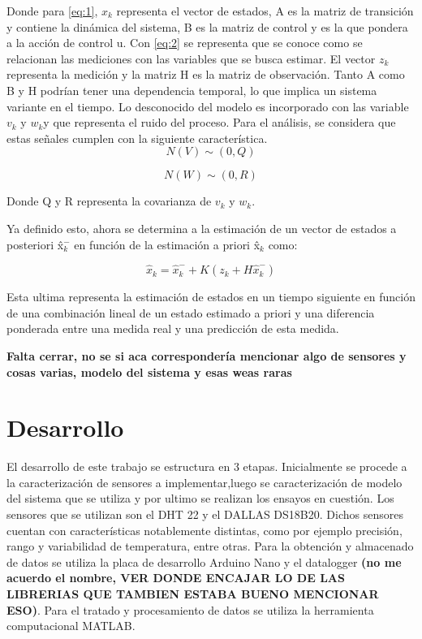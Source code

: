 \documentclass[journal]{IEEEtran}
\begin{document}
Donde para \ref{eq:1}, $x_{k}$ representa el vector de estados, A es la matriz de transición y contiene la dinámica
 del sistema, B es la matriz de control y es la que pondera a la acción de control u. Con \ref{eq:2} se representa 
 que se conoce como se relacionan las mediciones con las variables que se busca estimar. El vector $z_{k}$ representa 
 la medición y la matriz H es la matriz de observación. Tanto A como B y H podrían tener una dependencia temporal, 
 lo que implica un sistema variante en el tiempo.
 Lo desconocido del modelo es incorporado con las variable $v_{k}$ y $w_{k}$y  que representa el ruido del proceso. 
 Para el análisis, se considera que estas señales cumplen con la siguiente característica.
 \begin{equation}
 N(V)\sim(0,Q)
 \label{eq:3}
 \end{equation}


 \begin{equation}
 N(W)\sim(0,R)
  \label{eq:4}
 \end{equation}
 
 Donde Q y R representa la covarianza de $v_{k}$ y $w_{k}$.

Ya definido esto, ahora se determina a la estimación de un vector de estados a posteriori \^{x$_k^-$} en función de la estimación a priori \^{x$_k$} como:

 \begin{equation}
\hat{x}_k=\hat{x}_k^-+K(z_k+H\hat{x}_k^-)
  \label{eq:5}
 \end{equation}

Esta ultima representa la estimación de estados en un tiempo siguiente en función de una combinación lineal de un estado estimado a priori y una diferencia ponderada entre una medida real y una predicción de esta medida. 

\textbf{Falta cerrar, no se si aca correspondería mencionar algo de sensores y cosas varias, modelo del sistema y esas weas raras}\\


\section{Desarrollo}
El desarrollo de este trabajo se estructura en 3 etapas. Inicialmente se procede a la caracterización de sensores a implementar,luego se caracterización de modelo del sistema que se utiliza y por ultimo se realizan los ensayos en cuestión. 
Los sensores que se utilizan son el DHT 22 y el DALLAS DS18B20. Dichos sensores cuentan con características notablemente distintas, como por ejemplo precisión, rango y variabilidad de temperatura, entre otras. 
Para la obtención y almacenado de datos se utiliza la placa de desarrollo Arduino Nano y el datalogger \textbf{(no me acuerdo el nombre, VER DONDE ENCAJAR LO DE LAS LIBRERIAS QUE TAMBIEN ESTABA BUENO MENCIONAR ESO)}. Para el tratado y procesamiento de datos se utiliza la herramienta computacional MATLAB.
\end{document}
